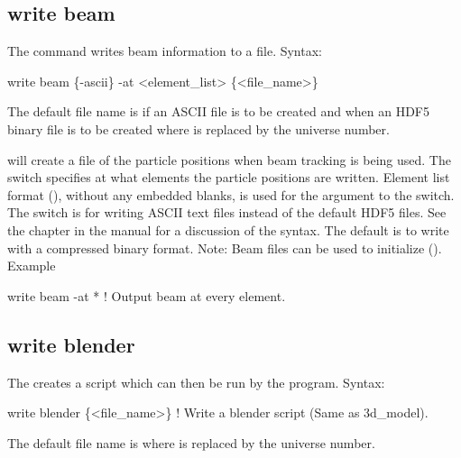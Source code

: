 {{{{{{{{{\subsection{write beam}
\label{s:write.beam}

The  command writes beam information to a file.
Syntax:
\begin{example}
    write beam \{-ascii\} -at <element_list> \{<file_name>\} 
\end{example}

The default file name is  if an ASCII file is to be created and  when
an HDF5 binary file is to be created where \vn{\#} is replaced by the universe number.

 will create a file of the particle positions when beam tracking is being used. The
 switch specifies at what elements the particle positions are written. Element list format
(), without any embedded blanks, is used for the 
argument to the  switch. The  switch is for writing ASCII text files instead of
the default HDF5 files. See the  chapter in the \bmad manual for a
discussion of the syntax. The default is to write with a compressed binary format. Note: Beam files
can be used to initialize \tao (). Example
\begin{example}
  write beam -at *   ! Output beam at every element.
\end{example}


\subsection{write blender}
\label{s:write.blender}

The  creates a script which can then be run by
the  program\cite{b:blender}. Syntax:
\begin{example}
    write blender \{<file_name>\}            ! Write a blender script (Same as 3d_model).
\end{example}

The default file name is  where \vn{\#} is replaced by the universe number. 

}}}}}}}}}
